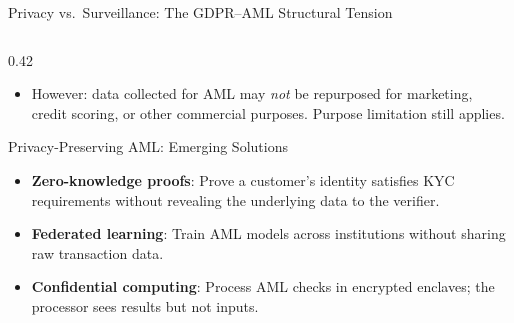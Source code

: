\begin{frame}{Privacy vs.\ Surveillance: The GDPR--AML Structural Tension}
\begin{columns}[T]
\begin{column}{0.42\textwidth}
\begin{itemize}
        \item However: data collected for AML may \emph{not} be repurposed for marketing, credit scoring, or other commercial purposes. Purpose limitation still applies.
      \end{itemize}
      \vspace{0.2em}
      \begin{exampleblock}{Privacy-Preserving AML: Emerging Solutions}
        \begin{itemize}\small
          \item \textbf{Zero-knowledge proofs}: Prove a customer's identity satisfies KYC requirements without revealing the underlying data to the verifier.
          \item \textbf{Federated learning}: Train AML models across institutions without sharing raw transaction data.
          \item \textbf{Confidential computing}: Process AML checks in encrypted enclaves; the processor sees results but not inputs.
        \end{itemize}
      \end{exampleblock}
    \end{column}
  \end{columns}
\end{frame}


